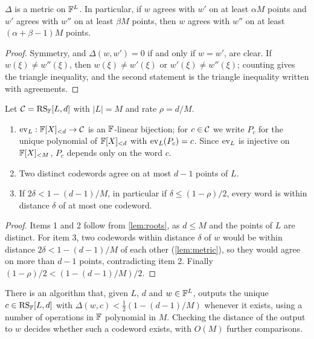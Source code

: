\begin{lemma}\label{lem:metric}
$\Delta$ is a metric on $\mathbb{F}^L$. In particular, if $w$ agrees with $w'$ on at least $\alpha M$ points and $w'$ agrees with $w''$ on at least $\beta M$ points, then $w$ agrees with $w''$ on at least $(\alpha + \beta - 1)M$ points.
\end{lemma}

\begin{proof}
Symmetry, and $\Delta(w,w') = 0$ if and only if $w = w'$, are clear. If $w(\xi) \ne w''(\xi)$, then $w(\xi) \ne w'(\xi)$ or $w'(\xi) \ne w''(\xi)$; counting gives the triangle inequality, and the second statement is the triangle inequality written with agreements.
\end{proof}

\begin{lemma}\label{lem:rs-params}
Let $\mathcal{C} = \mathrm{RS}_{\mathbb{F}}[L,d]$ with $|L| = M$ and rate $\rho = d/M$.
\begin{enumerate}
  \item $\mathrm{ev}_L : \mathbb{F}[X]_{<d} \to \mathcal{C}$ is an $\mathbb{F}$-linear bijection; for $c \in \mathcal{C}$ we write $P_c$ for the unique polynomial of $\mathbb{F}[X]_{<d}$ with $\mathrm{ev}_L(P_c) = c$. Since $\mathrm{ev}_L$ is injective on $\mathbb{F}[X]_{<M}$, $P_c$ depends only on the word $c$.
  \item Two distinct codewords agree on at most $d-1$ points of $L$.
  \item If $2\delta < 1 - (d-1)/M$, in particular if $\delta \le (1-\rho)/2$, every word is within distance $\delta$ of at most one codeword.
\end{enumerate}
\end{lemma}

\begin{proof}
Items 1 and 2 follow from \cref{lem:roots}, as $d \le M$ and the points of $L$ are distinct. For item 3, two codewords within distance $\delta$ of $w$ would be within distance $2\delta < 1 - (d-1)/M$ of each other (\cref{lem:metric}), so they would agree on more than $d - 1$ points, contradicting item 2. Finally $(1-\rho)/2 < (1 - (d-1)/M)/2$.
\end{proof}

\begin{fact}\label{fact:decode}
There is an algorithm that, given $L$, $d$ and $w \in \mathbb{F}^L$, outputs the unique $c \in \mathrm{RS}_{\mathbb{F}}[L,d]$ with $\Delta(w,c) < \tfrac12(1 - (d-1)/M)$ whenever it exists, using a number of operations in $\mathbb{F}$ polynomial in $M$.
Checking the distance of the output to $w$ decides whether such a codeword exists, with $O(M)$ further comparisons.
\end{fact}

